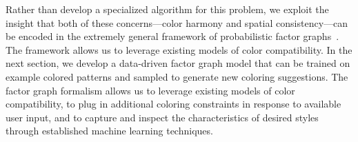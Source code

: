 Rather than develop a specialized algorithm for this problem, we exploit the insight that both of these concerns---color harmony and spatial consistency---can be encoded in the extremely general framework of probabilistic factor graphs~\cite{FactorGraphs}. The framework allows us to leverage existing models of color compatibility. In the next section, we develop a data-driven factor graph model that can be trained on example colored patterns and sampled to generate new coloring suggestions. The factor graph formalism allows us to leverage existing models of color compatibility, to plug in additional coloring constraints in response to available user input, and to capture and inspect the characteristics of desired styles through established machine learning techniques.
